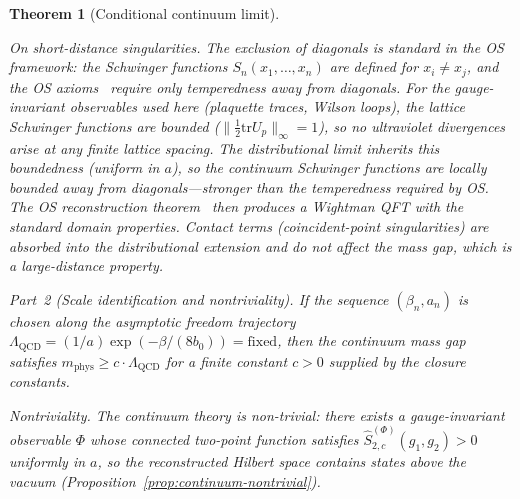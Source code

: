 \documentclass[11pt]{article}
\newtheorem{theorem}{Theorem}[section]
\theoremstyle{definition}
\newcommand{\tr}{\mathrm{tr}}
\newcommand{\Lam}{\Lambda_{\mathrm{QCD}}}
\begin{document}
\begin{theorem}[Conditional continuum limit]
\begin{enumerate}[nosep,label=(\roman*)]
\emph{On short-distance singularities.}
The exclusion of diagonals is standard in the OS framework:
the Schwinger functions $S_n(x_1,\ldots,x_n)$ are defined
for $x_i\ne x_j$, and the OS axioms~\cite{OS73} require
only temperedness away from diagonals.  For the gauge-invariant
observables used here (plaquette traces, Wilson loops),
the lattice Schwinger functions are \emph{bounded}
($\|\frac{1}{2}\tr U_p\|_\infty=1$), so no ultraviolet
divergences arise at any finite lattice spacing.
The distributional limit inherits this boundedness
(uniform in $a$), so the continuum Schwinger functions
are locally bounded away from diagonals---stronger than
the temperedness required by OS.
The OS reconstruction theorem~\cite{OS73} then produces
a Wightman QFT with the standard domain properties.
Contact terms (coincident-point singularities) are
absorbed into the distributional extension and do not
affect the mass gap, which is a large-distance property.
\end{enumerate}

\emph{Part~2 (Scale identification and nontriviality).}
If the sequence $(\beta_n,a_n)$ is chosen along the
asymptotic freedom trajectory
$\Lam=(1/a)\exp(-\beta/(8b_0))=\mathrm{fixed}$,
then the continuum mass gap satisfies $m_{\mathrm{phys}}\ge c\cdot\Lam$
for a finite constant $c>0$ supplied by the closure constants.


\emph{Nontriviality.}  The continuum theory is non-trivial:
there exists a gauge-invariant observable $\Phi$ whose
connected two-point function satisfies
$\hat S_{2,c}^{(\Phi)}(g_1,g_2)>0$ uniformly in $a$,
so the reconstructed Hilbert space contains states above
the vacuum (Proposition~\ref{prop:continuum-nontrivial}).
\end{theorem}
\end{document}
